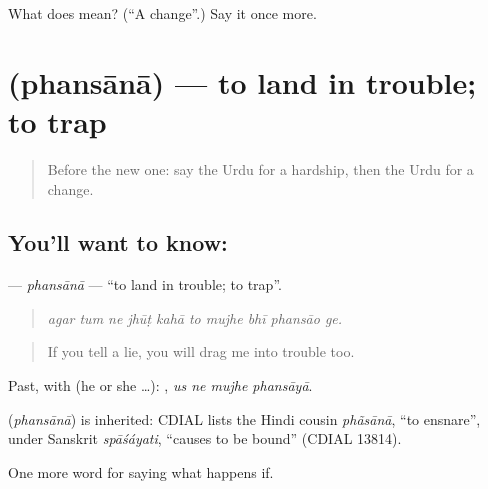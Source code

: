 \begin{tcolorbox}[breakable,colback=teal!4,colframe=teal!35!black,title={Before you move on}]
What does  mean? (\textquotedblleft{}A change\textquotedblright{}.) Say it once more.
\end{tcolorbox}
\section[\texorpdfstring{\ur{پھنسانا} (phansānā)}{پھنسانا (phansānā)}]{ (phansānā) — to land in trouble; to trap}

\label{lesson:UR-C365-phansana}



\begin{quote}
Before the new one: say the Urdu for a hardship, then the Urdu for a change.
\end{quote}

\subsection*{You'll want to know: }
\textbf{} — \emph{phansānā} — \textquotedblleft{}to land in trouble; to trap\textquotedblright{}.

\begin{quote}
         
\end{quote}

\begin{quote}
\emph{agar tum ne jhūṭ kahā to mujhe bhī phansāo ge.}
\end{quote}

\begin{quote}
If you tell a lie, you will drag me into trouble too.
\end{quote}

Past, with  (he or she …):    , \emph{us ne mujhe phansāyā}.

\begin{cousinweb}
\textbf{} (\emph{phansānā}) is inherited: CDIAL lists the Hindi cousin \emph{phãsānā}, \textquotedblleft{}to ensnare\textquotedblright{}, under Sanskrit \emph{spāśáyati}, \textquotedblleft{}causes to be bound\textquotedblright{} (CDIAL 13814).
\end{cousinweb}

\begin{grammarlens}[title={What you've built}]
One more word for saying what happens if.
\end{grammarlens}

